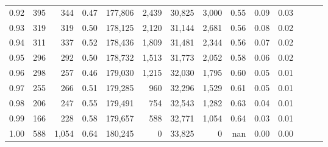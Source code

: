 \begin{tabular}{rrrrrrrrrrrrrr}
0.92 &    395 &    344 &  0.47 &  177,806 &    2,439 &  30,825 &   3,000 &  0.55 &  0.09 &      0.03 \\
0.93 &    319 &    319 &  0.50 &  178,125 &    2,120 &  31,144 &   2,681 &  0.56 &  0.08 &      0.02 \\
0.94 &    311 &    337 &  0.52 &  178,436 &    1,809 &  31,481 &   2,344 &  0.56 &  0.07 &      0.02 \\
0.95 &    296 &    292 &  0.50 &  178,732 &    1,513 &  31,773 &   2,052 &  0.58 &  0.06 &      0.02 \\
0.96 &    298 &    257 &  0.46 &  179,030 &    1,215 &  32,030 &   1,795 &  0.60 &  0.05 &      0.01 \\
0.97 &    255 &    266 &  0.51 &  179,285 &      960 &  32,296 &   1,529 &  0.61 &  0.05 &      0.01 \\
0.98 &    206 &    247 &  0.55 &  179,491 &      754 &  32,543 &   1,282 &  0.63 &  0.04 &      0.01 \\
0.99 &    166 &    228 &  0.58 &  179,657 &      588 &  32,771 &   1,054 &  0.64 &  0.03 &      0.01 \\
1.00 &    588 &  1,054 &  0.64 &  180,245 &        0 &  33,825 &       0 &   nan &  0.00 &      0.00 \\
\bottomrule
\end{tabular}
